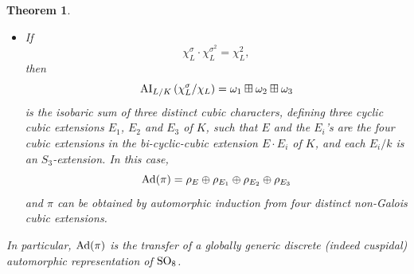 \documentclass[11pt]{amsart}
\theoremstyle{plain}
\newtheorem{thm}[equation]{Theorem}
\numberwithin{equation}{section}
\def\SO{{\rm SO}}
\begin{document}
\begin{thm}
\begin{itemize}
\item[(c)]  If 
\[ \chi_L^{\sigma} \cdot \chi_L^{\sigma^2}  =  \chi_L^2, \]
 then 
\[  {\rm AI}_{L/K}\left( \chi_L^{\sigma}/ \chi_L \right)   = \omega_1 \boxplus \omega_2 \boxplus \omega_3 \]
is the isobaric sum of three distinct cubic characters, defining three cyclic cubic extensions $E_1$, $E_2$ and $E_3$ of $K$, such that 
$E$ and the $E_i$'s are the four cubic extensions in  the bi-cyclic-cubic extension $E \cdot E_i$ of $K$, and each  $E_i/k$ is an $S_3$-extension.
In this case, 
\[ {\rm Ad}(\pi) = \rho_E \oplus \rho_{E_1} \oplus \rho_{E_2} \oplus \rho_{E_3} \]
and $\pi$ can be obtained by automorphic induction from four  distinct non-Galois cubic extensions.  
\end{itemize}

In particular,  ${\rm Ad}(\pi)$ is the transfer of a globally generic discrete (indeed cuspidal) automorphic  representation of $\SO_8$.
\end{thm}
\vskip 5pt
\end{document}
